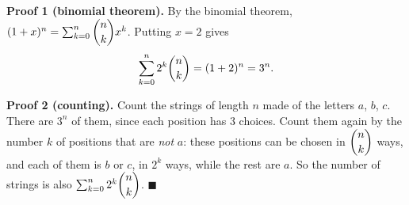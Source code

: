 \textbf{Proof 1 (binomial theorem).} By the binomial theorem, $(1+x)^n=\sum_{k=0}^{n}\dbinom nk x^k$. Putting $x=2$ gives
\[\sum_{k=0}^{n}2^k\dbinom nk=(1+2)^n=3^n.\]

\textbf{Proof 2 (counting).} Count the strings of length $n$ made of the letters $a$, $b$, $c$. There are $3^n$ of them, since each position has $3$ choices. Count them again by the number $k$ of positions that are \emph{not} $a$: these positions can be chosen in $\dbinom nk$ ways, and each of them is $b$ or $c$, in $2^k$ ways, while the rest are $a$. So the number of strings is also $\sum_{k=0}^{n}2^k\dbinom nk$. $\blacksquare$
